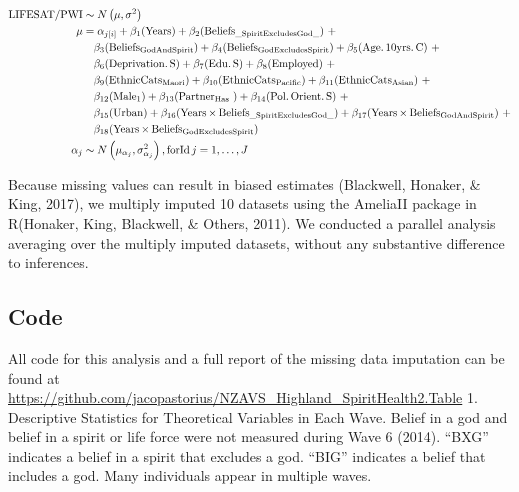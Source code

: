 \documentclass[
  english,
  man]{apa6}
\begin{document}
\[
\begin{aligned}
\operatorname{{\small LIFESAT/PWI}}  &\sim N \left(\mu,\sigma^2 \right) \\ \mu &=\alpha_{j[i]} + \beta_{1}(\operatorname{Years}) + \beta_{2}(\operatorname{Beliefs}_{\operatorname{\_SpiritExcludesGod\_}})\ + \\
&\quad \beta_{3}(\operatorname{Beliefs}_{\operatorname{GodAndSpirit}}) + \beta_{4}(\operatorname{Beliefs}_{\operatorname{GodExcludesSpirit}}) + \beta_{5}(\operatorname{Age.10yrs.C})\ + \\
&\quad \beta_{6}(\operatorname{Deprivation.S}) + \beta_{7}(\operatorname{Edu.S}) + \beta_{8}(\operatorname{Employed})\ + \\
&\quad \beta_{9}(\operatorname{EthnicCats}_{\operatorname{Maori}}) + \beta_{10}(\operatorname{EthnicCats}_{\operatorname{Pacific}}) + \beta_{11}(\operatorname{EthnicCats}_{\operatorname{Asian}})\ + \\
&\quad \beta_{12}(\operatorname{Male}_{\operatorname{1}}) + \beta_{13}(\operatorname{Partner}_{\operatorname{Has\ }}) + \beta_{14}(\operatorname{Pol.Orient.S})\ + \\
&\quad \beta_{15}(\operatorname{Urban}) + \beta_{16}(\operatorname{Years} \times \operatorname{Beliefs}_{\operatorname{\_SpiritExcludesGod\_}}) + \beta_{17}(\operatorname{Years} \times \operatorname{Beliefs}_{\operatorname{GodAndSpirit}})\ + \\
&\quad \beta_{18}(\operatorname{Years} \times \operatorname{Beliefs}_{\operatorname{GodExcludesSpirit}}) \\ \alpha_{j} &\sim N \left(\mu_{\alpha_{j}},\sigma^2_{\alpha_{j}} \right) , \operatorname{ for  Id } j  = 1, \dots ,  J
\end{aligned}
\]

Because missing values can result in biased estimates (Blackwell, Honaker, \& King, 2017), we multiply imputed 10 datasets using the AmeliaII package in R(Honaker, King, Blackwell, \& Others, 2011). We conducted a parallel analysis averaging over the multiply imputed datasets, without any substantive difference to inferences.

\hypertarget{code}{%
\subsection{Code}\label{code}}

All code for this analysis and a full report of the missing data imputation can be found at \url{https://github.com/jacopastorius/NZAVS_Highland_SpiritHealth2.Table} 1. Descriptive Statistics for Theoretical Variables in Each Wave. Belief in a god and belief in a spirit or life force were not measured during Wave 6 (2014). \enquote{BXG} indicates a belief in a spirit that excludes a god. \enquote{BIG} indicates a belief that includes a god. Many individuals appear in multiple waves.
\end{document}
